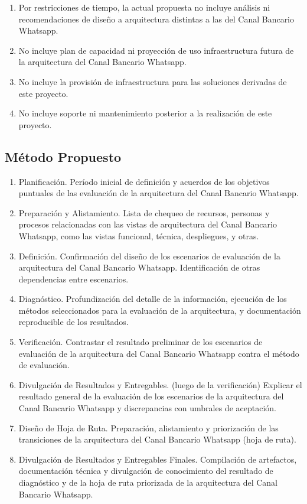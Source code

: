 \documentclass[
  paper=a4,
  ,captions=tableheading
]{scrartcl}
\providecommand{\tightlist}{%
  \setlength{\itemsep}{0pt}\setlength{\parskip}{0pt}}
\renewenvironment{quote}{\begin{customblockquote}\list{}{\rightmargin=0em\leftmargin=0em}%
\item\relax\color{blockquote-text}\ignorespaces}{\unskip\unskip\endlist\end{customblockquote}}
\begin{document}
\begin{enumerate}
\def\labelenumi{\arabic{enumi}.}
\tightlist
\item
  Por restricciones de tiempo, la actual propuesta no incluye análisis
  ni recomendaciones de diseño a arquitectura distintas a las del Canal
  Bancario Whatsapp.
\item
  No incluye plan de capacidad ni proyección de uso infraestructura
  futura de la arquitectura del Canal Bancario Whatsapp.
\item
  No incluye la provisión de infraestructura para las soluciones
  derivadas de este proyecto.
\item
  No incluye soporte ni mantenimiento posterior a la realización de este
  proyecto.
\end{enumerate}

\subsection{Método Propuesto}\label{sec:muxe9todo-propuesto}

\begin{quote}
\end{quote}

\begin{enumerate}
\def\labelenumi{\arabic{enumi}.}
\tightlist
\item
  Planificación. Período inicial de definición y acuerdos de los
  objetivos puntuales de las evaluación de la arquitectura del Canal
  Bancario Whatsapp.
\item
  Preparación y Alistamiento. Lista de chequeo de recursos, personas y
  procesos relacionadas con las vistas de arquitectura del Canal
  Bancario Whatsapp, como las vistas funcional, técnica, despliegues, y
  otras.
\item
  Definición. Confirmación del diseño de los escenarios de evaluación de
  la arquitectura del Canal Bancario Whatsapp. Identificación de otras
  dependencias entre escenarios.
\item
  Diagnóstico. Profundización del detalle de la información, ejecución
  de los métodos seleccionados para la evaluación de la arquitectura, y
  documentación reproducible de los resultados.
\item
  Verificación. Contrastar el resultado preliminar de los escenarios de
  evaluación de la arquitectura del Canal Bancario Whatsapp contra el
  método de evaluación.
\item
  Divulgación de Resultados y Entregables. (luego de la verificación)
  Explicar el resultado general de la evaluación de los escenarios de la
  arquitectura del Canal Bancario Whatsapp y discrepancias con umbrales
  de aceptación.
\item
  Diseño de Hoja de Ruta. Preparación, alistamiento y priorización de
  las transiciones de la arquitectura del Canal Bancario Whatsapp (hoja
  de ruta).
\item
  Divulgación de Resultados y Entregables Finales. Compilación de
  artefactos, documentación técnica y divulgación de conocimiento del
  resultado de diagnóstico y de la hoja de ruta priorizada de la
  arquitectura del Canal Bancario Whatsapp.
\end{enumerate}
\end{document}
